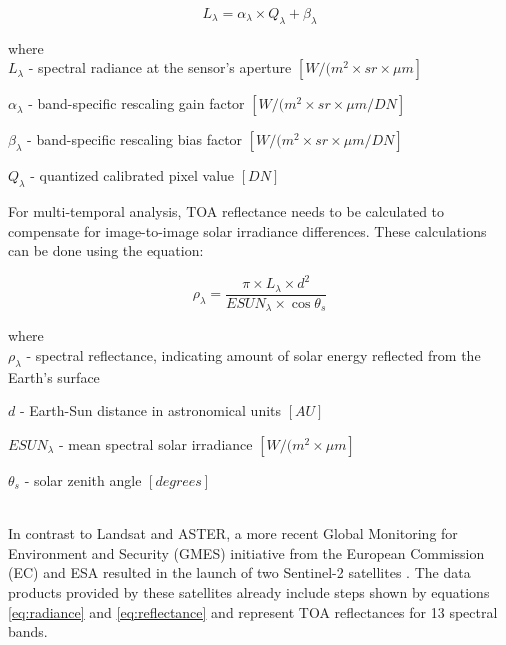 \begin{samepage}
	\begin{equation}
	\label{eq:radiance}
	L_\lambda = \alpha_\lambda \times Q_\lambda + \beta_\lambda
	\end{equation}
	
	where
	\\
	
	$L_\lambda$ - spectral radiance at the sensor's aperture $[W/(m^2 \times sr \times \mu{m}]$
	
	$\alpha_\lambda$ - band-specific rescaling gain factor  $[W/(m^2 \times sr \times \mu{m} / DN]$
	
	$\beta_\lambda$ - band-specific rescaling bias factor  $[W/(m^2 \times sr \times \mu{m} / DN]$
	
	$Q_\lambda$ - quantized calibrated pixel value $[DN]$
	\\
\end{samepage}

For multi-temporal analysis, TOA reflectance needs to be calculated to compensate for image-to-image solar irradiance differences. These calculations can be done using the equation:

\begin{samepage}
	\begin{equation}
	\label{eq:reflectance}
	\rho_\lambda = \frac{\pi \times L_\lambda \times d^2}{ESUN_\lambda \times \cos \theta_s}
	\end{equation}
	
	where
	\\
	
	$\rho_\lambda$ - spectral reflectance, indicating amount of solar energy reflected from the Earth's surface
	
	$d$ - Earth-Sun distance in astronomical units $[AU]$
	
	$ESUN_\lambda$ - mean spectral solar irradiance $[W/(m^2 \times \mu{m}]$
	
	$\theta_s$ - solar zenith angle $[degrees]$
\end{samepage}
\\

In contrast to Landsat and ASTER, a more recent Global Monitoring for Environment and Security (GMES) initiative from the European Commission (EC) and ESA resulted in the launch of two Sentinel-2 satellites \citet{drusch2012sentinel}. The data products provided by these satellites already include steps shown by equations \eqref{eq:radiance} and \eqref{eq:reflectance} and represent TOA reflectances for 13 spectral bands. 

